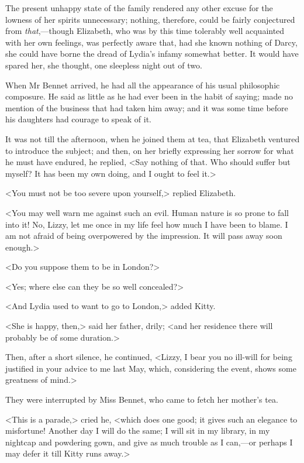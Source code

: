 The present unhappy state of the family rendered any other excuse for the lowness of her spirits unnecessary; nothing, therefore, could be fairly conjectured from \textit{that},—though Elizabeth, who was by this time tolerably well acquainted with her own feelings, was perfectly aware that, had she known nothing of Darcy, she could have borne the dread of Lydia's infamy somewhat better. It would have spared her, she thought, one sleepless night out of two.

When Mr Bennet arrived, he had all the appearance of his usual philosophic composure. He said as little as he had ever been in the habit of saying; made no mention of the business that had taken him away; and it was some time before his daughters had courage to speak of it.

It was not till the afternoon, when he joined them at tea, that Elizabeth ventured to introduce the subject; and then, on her briefly expressing her sorrow for what he must have endured, he replied, <Say nothing of that. Who should suffer but myself? It has been my own doing, and I ought to feel it.>

<You must not be too severe upon yourself,> replied Elizabeth.

<You may well warn me against such an evil. Human nature is so prone to fall into it! No, Lizzy, let me once in my life feel how much I have been to blame. I am not afraid of being overpowered by the impression. It will pass away soon enough.>

<Do you suppose them to be in London?>

<Yes; where else can they be so well concealed?>

<And Lydia used to want to go to London,> added Kitty.

<She is happy, then,> said her father, drily; <and her residence there will probably be of some duration.>

Then, after a short silence, he continued, <Lizzy, I bear you no ill-will for being justified in your advice to me last May, which, considering the event, shows some greatness of mind.>

They were interrupted by Miss Bennet, who came to fetch her mother's tea.

<This is a parade,> cried he, <which does one good; it gives such an elegance to misfortune! Another day I will do the same; I will sit in my library, in my nightcap and powdering gown, and give as much trouble as I can,—or perhaps I may defer it till Kitty runs away.>


